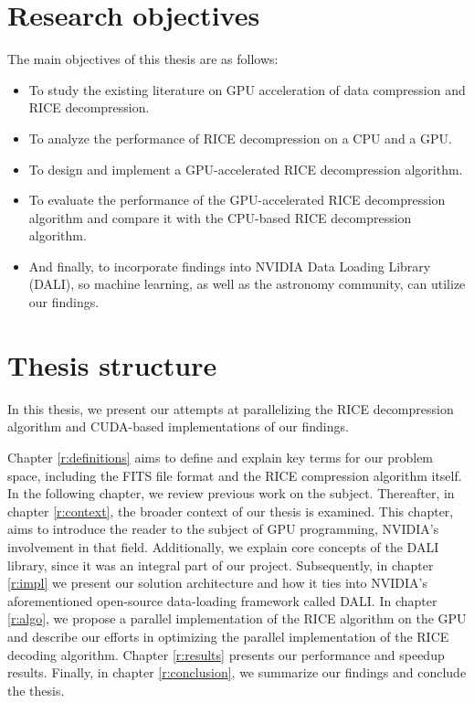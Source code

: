 \documentclass[licencjacka,en]{pracamgr}
\begin{document}
\section{Research objectives}
The main objectives of this thesis are as follows:

\begin{itemize}
    \item To study the existing literature on GPU acceleration of data compression and RICE decompression.
    \item To analyze the performance of RICE decompression on a CPU and a GPU.
    \item To design and implement a GPU-accelerated RICE decompression algorithm.
    \item To evaluate the performance of the GPU-accelerated RICE decompression algorithm and compare it with the CPU-based RICE decompression algorithm.
    \item And finally, to incorporate findings into NVIDIA Data Loading Library (DALI)\cite{dali-docs}, so machine learning, as well as the astronomy community, can utilize our findings.
\end{itemize}

\section{Thesis structure}
In this thesis, we present our attempts at parallelizing the RICE decompression algorithm and CUDA-based implementations of our findings. 

 Chapter \ref{r:definitions} aims to define and explain key terms for our problem space, including the FITS file format and the RICE compression algorithm itself. In the following chapter, we review previous work on the subject. Thereafter, in chapter \ref{r:context}, the broader context of our thesis is examined. This chapter, aims to introduce the reader to the subject of GPU programming, NVIDIA's involvement in that field. Additionally, we explain core concepts of the DALI library, since it was an integral part of our project. Subsequently, in chapter \ref{r:impl} we present our solution architecture and how it ties into NVIDIA's aforementioned open-source data-loading framework called DALI. In chapter \ref{r:algo}, we propose a parallel implementation of the RICE algorithm on the GPU and describe our efforts in optimizing the parallel implementation of the RICE decoding algorithm. Chapter \ref{r:results} presents our performance and speedup results. Finally, in chapter \ref{r:conclusion}, we summarize our findings and conclude the thesis.
\end{document}
